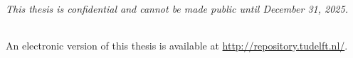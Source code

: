 \begin{titlepage}
\begin{center}
        \bigskip
        \bigskip
        \emph{This thesis is confidential and cannot be made public until December 31, 2025.}

        \bigskip
        \bigskip
        \begin{tabular}{p{15mm}p{10cm}}
        \end{tabular}

        \bigskip
        \bigskip
        An electronic version of this thesis is available at \url{http://repository.tudelft.nl/}.

    \end{center}


\end{titlepage}
